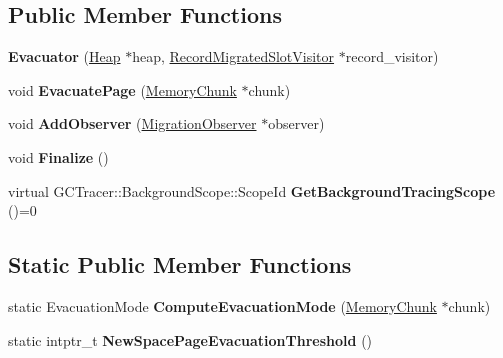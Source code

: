 \subsection*{Public Member Functions}
\begin{DoxyCompactItemize}
\item 
\mbox{\label{classv8_1_1internal_1_1Evacuator_a52a3fa7198613e2656e56bd619428995}} 
{\bfseries Evacuator} (\mbox{\hyperlink{classv8_1_1internal_1_1Heap}{Heap}} $\ast$heap, \mbox{\hyperlink{classv8_1_1internal_1_1RecordMigratedSlotVisitor}{Record\+Migrated\+Slot\+Visitor}} $\ast$record\+\_\+visitor)
\item 
\mbox{\label{classv8_1_1internal_1_1Evacuator_aea11393389175038beacc47295513c07}} 
void {\bfseries Evacuate\+Page} (\mbox{\hyperlink{classv8_1_1internal_1_1MemoryChunk}{Memory\+Chunk}} $\ast$chunk)
\item 
\mbox{\label{classv8_1_1internal_1_1Evacuator_aff74cdcc3d9b14d81a3a023f13e403f1}} 
void {\bfseries Add\+Observer} (\mbox{\hyperlink{classv8_1_1internal_1_1MigrationObserver}{Migration\+Observer}} $\ast$observer)
\item 
\mbox{\label{classv8_1_1internal_1_1Evacuator_ac796527afb0f320c5fcdbabb255f741b}} 
void {\bfseries Finalize} ()
\item 
\mbox{\label{classv8_1_1internal_1_1Evacuator_a49bfa112b58c7f31ba9cf74372b86406}} 
virtual G\+C\+Tracer\+::\+Background\+Scope\+::\+Scope\+Id {\bfseries Get\+Background\+Tracing\+Scope} ()=0
\end{DoxyCompactItemize}
\subsection*{Static Public Member Functions}
\begin{DoxyCompactItemize}
\item 
\mbox{\label{classv8_1_1internal_1_1Evacuator_a6ac2dddaa2b1b1ddb1a576575595016c}} 
static Evacuation\+Mode {\bfseries Compute\+Evacuation\+Mode} (\mbox{\hyperlink{classv8_1_1internal_1_1MemoryChunk}{Memory\+Chunk}} $\ast$chunk)
\item 
\mbox{\label{classv8_1_1internal_1_1Evacuator_a9c67e24363baa037a4ca54f62d4d058a}} 
static intptr\+\_\+t {\bfseries New\+Space\+Page\+Evacuation\+Threshold} ()
\end{DoxyCompactItemize}
